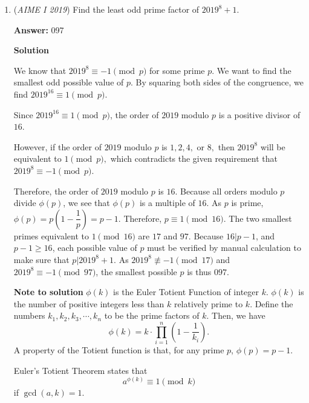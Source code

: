 \begin{enumerate}
 So
 \[\frac{AX}{FX} = \frac{XC}{XD} = \frac{AC}{FD} \implies \frac{4 + r}{FX} = \frac{XC}{s} = 3\]
 \[\frac{BX}{FX} = \frac{XC}{XE} = \frac{BC}{FE} \implies \frac{r}{FX} = \frac{XC}{s + 4 \sqrt{2}} = \frac{5}{7}\]
 \[\implies \frac{4 + r}{r} = \frac{s + 4 \sqrt{2}}{s} = \frac{21}{5}\]
 \[\implies r = \frac{5}{4}, s = \frac{5 \sqrt{2}}{4}\]So $BE = r + s + 4 \sqrt{2} = \frac{5 + 21 \sqrt{2}}{4}$. The requested sum is $5 + 21 + 2 + 4 = \boxed{032}$.

 


	\item (\textit{AIME I 2019}) Find the least odd prime factor of $2019^8 + 1$.


 
 \textbf{Answer: }097



\textbf{Solution}

We know that $2019^8 \equiv -1 \pmod{p}$ for some prime $p$. We want to find the smallest odd possible value of $p$. By squaring both sides of the congruence, we find $2019^{16} \equiv 1 \pmod{p}$.   

 Since $2019^{16} \equiv 1 \pmod{p}$, the order of $2019$ modulo $p$ is a positive divisor of $16$.

 However, if the order of $2019$ modulo $p$ is $1, 2, 4,$ or $8,$ then $2019^8$ will be equivalent to $1 \pmod{p},$ which contradicts the given requirement that $2019^8\equiv -1\pmod{p}$.

 Therefore, the order of $2019$ modulo $p$ is $16$. Because all orders modulo $p$ divide $\phi(p)$, we see that $\phi(p)$ is a multiple of $16$. As $p$ is prime, $\phi(p) = p\left(1 - \dfrac{1}{p}\right) = p - 1$. Therefore, $p\equiv 1 \pmod{16}$. The two smallest primes equivalent to $1 \pmod{16}$ are $17$ and $97$. Because $16 | p - 1$, and $p - 1  \geq 16$, each possible value of $p$ must be verified by manual calculation to make sure that $p | 2019^8+1$. As $2019^8 \not\equiv -1 \pmod{17}$ and $2019^8 \equiv -1 \pmod{97}$, the smallest possible $p$ is thus $\boxed{097}$.

 \textbf{Note to solution} $\phi(k)$ is the Euler Totient Function of integer $k$. $\phi(k)$ is the number of positive integers less than $k$ relatively prime to $k$. Define the numbers $k_1,k_2,k_3,\cdots,k_n$ to be the prime factors of $k$. Then, we have
 \[\phi(k)=k\cdot \prod^n_{i=1}\left(1-\dfrac{1}{k_i}\right).\]A property of the Totient function is that, for any prime $p$, $\phi(p)=p-1$.

 Euler's Totient Theorem states that
 \[a^{\phi(k)} \equiv 1\pmod k\]if $\gcd(a,k)=1$.


\end{enumerate}

